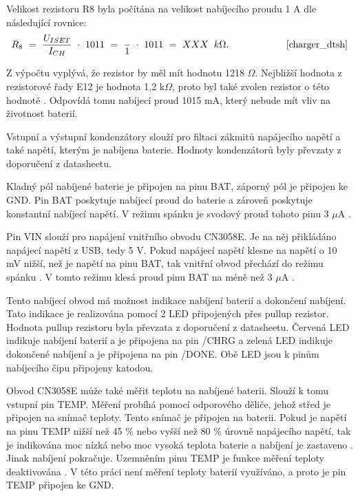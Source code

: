 

Velikost rezistoru R8 byla počítána na velikost nabíjecího proudu 1 A dle následující rovnice:
\begin{equation} 
  R_{8}~=~\frac{U_{ISET}}{I_{CH}}~\cdot~1011~=~\frac{}{1}~\cdot~1011~=~XXX~\:k\Omega. 
  \quad \quad \quad \quad \quad \quad \cite{charger_dtsh}
\label{eq:I_CH}
\end{equation}


Z výpočtu vyplývá, že rezistor by měl mít hodnotu 1218 $\Omega$. Nejbližší hodnota z rezistorové řady E12 je hodnota 1,2 k$\Omega$, proto byl také zvolen rezistor 
o této hodnotě \cite{rezistorova_rada}. Odpovídá tomu nabíjecí proud 1015 mA, který nebude mít vliv na životnost baterií. 


Vstupní a výstupní kondenzátory slouží pro filtaci zákmitů napájecího napětí a také napětí, kterým je nabíjena baterie. Hodnoty kondenzátorů byly převzaty
z doporučení z datasheetu.

Kladný pól nabíjené baterie je připojen na pinu BAT, záporný pól je připojen ke GND. Pin BAT poskytuje nabíjecí proud do baterie a zároveň poskytuje konstantní 
nabíjecí napětí. V režimu spánku je svodový proud tohoto pinu 3 $\mu$A \cite{charger_dtsh}. 

Pin VIN slouží pro napájení vnitřního obvodu CN3058E. Je na něj přikládáno napájecí napětí z USB, tedy 5 V. Pokud napájecí napětí klesne na napětí o 10 mV nižší, 
než je napětí na pinu BAT, tak vnitřní obvod přechází do režimu spánku \cite{charger_dtsh}. V tomto režimu klesá proud pinu BAT na méně než 3 $\mu$A \cite{charger_dtsh}.

Tento nabíjecí obvod má možnost indikace nabíjení baterií a dokončení nabíjení. Tato indikace je realizována pomocí 2 LED připojených přes pullup rezistor. Hodnota
pullup rezistoru byla převzata z doporučení z datasheetu. Červená LED indikuje nabíjení baterií a je připojena na pin /CHRG a zelená LED indikuje dokončené nabíjení 
a je připojena na pin /DONE. Obě LED jsou k pinům nabíjecího čipu připojeny katodou. 

Obvod CN3058E může také měřit teplotu na nabíjené baterii. Slouží k tomu vstupní pin TEMP. Měření probíhá pomocí odporového děliče, jehož střed je připojen na snímač 
teploty. Tento snímač je připojen na baterii. Pokud je napětí na pinu TEMP nižší než 45 \% nebo vyšší než 80 \% úrovně napájecího napětí, tak je indikována moc nízká
nebo moc vysoká teplota baterie a nabíjení je zastaveno \cite{charger_dtsh}. Jinak nabíjení pokračuje. Uzemněním pinu TEMP je funkce měření teploty deaktivována \cite{charger_dtsh}. 
V této práci není měření teploty baterií využíváno, a proto je pin TEMP připojen ke GND. 

